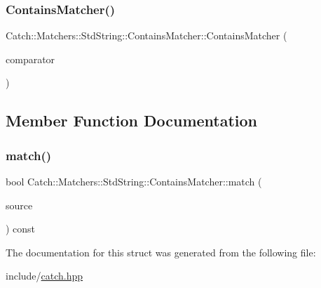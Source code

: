 \subsubsection{\texorpdfstring{ContainsMatcher()}{ContainsMatcher()}}
{\footnotesize\ttfamily Catch\+::\+Matchers\+::\+Std\+String\+::\+Contains\+Matcher\+::\+Contains\+Matcher (\begin{DoxyParamCaption}\item[{\mbox{\hyperlink{struct_catch_1_1_matchers_1_1_std_string_1_1_cased_string}{Cased\+String}} const \&}]{comparator }\end{DoxyParamCaption})}



\subsection{Member Function Documentation}
\mbox{\label{struct_catch_1_1_matchers_1_1_std_string_1_1_contains_matcher_a630628b234b037be83fe587081a80b53}} 
\subsubsection{\texorpdfstring{match()}{match()}}
{\footnotesize\ttfamily bool Catch\+::\+Matchers\+::\+Std\+String\+::\+Contains\+Matcher\+::match (\begin{DoxyParamCaption}\item[{std\+::string const \&}]{source }\end{DoxyParamCaption}) const\hspace{0.3cm}{\ttfamily [override]}}



The documentation for this struct was generated from the following file\+:\begin{DoxyCompactItemize}
\item 
include/\mbox{\hyperlink{catch_8hpp}{catch.\+hpp}}\end{DoxyCompactItemize}
